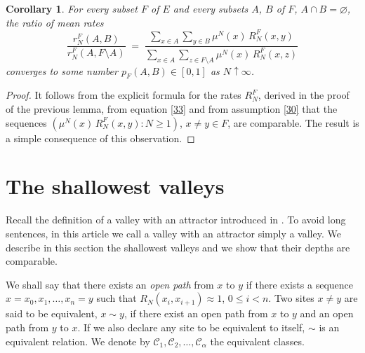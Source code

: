 \documentclass[reqno]{amsart}
\newtheorem{corollary}[theorem]{Corollary}
\begin{document}
\begin{corollary}
\label{s32}
For every subset $F$ of $E$ and every subsets $A$, $B$ of $F$, $A\cap
B=\varnothing$, the ratio of mean rates
\begin{equation*}
\frac{r^F_N(A,B)}{r^F_N(A,F\setminus A)} \;=\;
\frac{\sum_{x\in A} \sum_{y\in B} \mu^N(x) \, R^F_N (x,y)}
{\sum_{x\in A} \sum_{z\in F\setminus A} \mu^N(x) \, R^F_N (x,z)}
\end{equation*}
converges to some number $p_F(A,B)\in [0,1]$ as $N\uparrow\infty$.
\end{corollary}

\begin{proof}
It follows from the explicit formula for the rates $R^F_N$, derived in
the proof of the previous lemma, from equation \eqref{33} and from
assumption \eqref{30} that the sequences $(\mu^N(x) \, R^F_N(x,y):N\ge
1)$, $x\not = y\in F$, are comparable. The result is a simple
consequence of this observation.
\end{proof}

\section{The shallowest valleys}
\label{ssec5}

Recall the definition of a valley with an attractor introduced in
\cite{bl2}. To avoid long sentences, in this article we call a valley
with an attractor simply a valley. We describe in this section the
shallowest valleys and we show that their depths are comparable.

We shall say that there exists an \emph{open path} from $x$ to $y$ if
there exists a sequence $x=x_0, x_1, \dots, x_n=y$ such that $R_N(x_i,
x_{i+1})\approx 1$, $0\le i < n$. Two sites $x \not = y$ are said to
be equivalent, $x \sim y$, if there exist an open path from $x$ to $y$
and an open path from $y$ to $x$.  If we also declare any site to be
equivalent to itself, $\sim$ is an equivalent relation. We denote by
${{\mathcal C}}_1, {{\mathcal C}}_2, \dots, {{\mathcal C}}_{\alpha}$ the equivalent classes.
\end{document}
